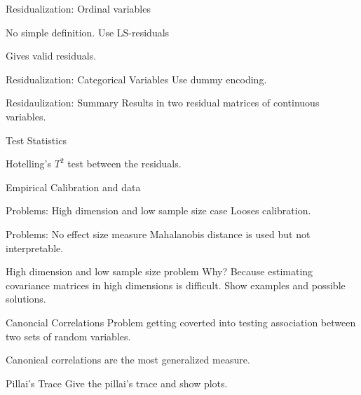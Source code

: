\documentclass{beamer}
\begin{document}
\begin{frame}{Residualization: Ordinal variables}

	No simple definition. Use LS-residuals

	Gives valid residuals.
\end{frame}

\begin{frame}{Residualization: Categorical Variables}
	Use dummy encoding.
\end{frame}

\begin{frame}{Residaulization: Summary}
	Results in two residual matrices of continuous variables.
\end{frame}

\begin{frame}{Test Statistics}
	\begin{enumerate}
		Hotelling's $T^2$ test between the residuals.
	\end{enumerate}
\end{frame}

\begin{frame}{Empirical Calibration and data}
\end{frame}

\begin{frame}{Problems: High dimension and low sample size case}
	Looses calibration.
\end{frame}

\begin{frame}{Problems: No effect size measure}
	Mahalanobis distance is used but not interpretable.
\end{frame}

\begin{frame}{High dimension and low sample size problem}
	Why?
	Because estimating covariance matrices in high dimensions is difficult.
	Show examples and possible solutions.
\end{frame}

\begin{frame}{Canoncial Correlations}
	Problem getting coverted into testing association between two 
	sets of random variables.

	Canonical correlations are the most generalized measure.
\end{frame}

\begin{frame}{Pillai's Trace}
	Give the pillai's trace and show plots.
\end{frame}
\end{document}
